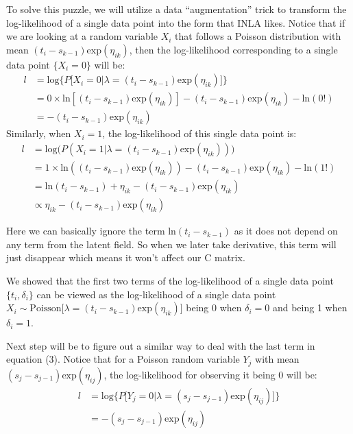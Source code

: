 \documentclass[]{article}
\begin{document}
To solve this puzzle, we will utilize a data ``augmentation'' trick to
transform the log-likelihood of a single data point into the form that
INLA likes. Notice that if we are looking at a random variable \(X_i\)
that follows a Poisson distribution with mean
\((t_i-s_{k-1})\text{exp}(\eta_{ik})\), then the log-likelihood
corresponding to a single data point \(\{X_i = 0 \}\) will be:
\begin{equation}\begin{aligned}\label{eqn:loglike1}
l &= \text{log}\bigg \{P\big [X_i =0|\lambda = (t_i-s_{k-1})\text{exp}(\eta_{ik}) \big]\bigg \}\\
  &= 0\times \text{ln}[(t_i-s_{k-1})\text{exp}(\eta_{ik})] - (t_i-s_{k-1})\text{exp}(\eta_{ik}) - \text{ln}(0!)\\
  &= - (t_i-s_{k-1})\text{exp}(\eta_{ik})
\end{aligned}\end{equation} Similarly, when \(X_i = 1\), the
log-likelihood of this single data point is:
\begin{equation}\begin{aligned}\label{eqn:loglike2}
l &= \text{log}\bigg(P(X_i =1|\lambda = (t_i-s_{k-1})\text{exp}(\eta_{ik}))\bigg)\\
  &= 1\times \text{ln}((t_i-s_{k-1})\text{exp}(\eta_{ik})) - (t_i-s_{k-1})\text{exp}(\eta_{ik}) - \text{ln}(1!)\\
  &= \text{ln}(t_i-s_{k-1})+\eta_{ik}-(t_i-s_{k-1})\text{exp}(\eta_{ik})\\
  &\propto \eta_{ik}-(t_i-s_{k-1})\text{exp}(\eta_{ik})
\end{aligned}\end{equation}

Here we can basically ignore the term \(\text{ln}(t_i-s_{k-1})\) as it
does not depend on any term from the latent field. So when we later take
derivative, this term will just disappear which means it won't affect
our C matrix.

We showed that the first two terms of the log-likelihood of a single
data point \(\{t_i,\delta_i\}\) can be viewed as the log-likelihood of a
single data point
\(X_i\sim \text{Poisson}\big[\lambda =(t_i-s_{k-1})\text{exp}(\eta_{ik})\big]\)
being \(0\) when \(\delta_i = 0\) and being 1 when \(\delta_i = 1\).

Next step will be to figure out a similar way to deal with the last term
in equation (3). Notice that for a Poisson random variable \(Y_j\) with
mean \((s_{j}-s_{j-1})\text{exp}(\eta_{ij})\), the log-likelihood for
observing it being \(0\) will be:
\begin{equation}\begin{aligned}\label{eqn:loglike3}
l &= \text{log}\bigg \{P\big [Y_j =0|\lambda = (s_{j}-s_{j-1})\text{exp}(\eta_{ij})\big ]\bigg \}\\
  &= -(s_{j}-s_{j-1})\text{exp}(\eta_{ij})
\end{aligned}\end{equation}
\end{document}

